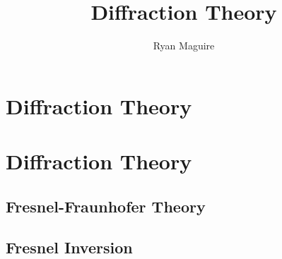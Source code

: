 \documentclass[crop=false,class=book,oneside]{standalone}
\begin{document}
    \ifx\ifplanetdiff\undefined
        \title{Diffraction Theory}
        \author{Ryan Maguire}
        \date{\vspace{-5ex}}
        \maketitle
        \tableofcontents
        \clearpage
        \chapter{Diffraction Theory}
    \else
        \chapter{Diffraction Theory}
    \fi
    \section{Fresnel-Fraunhofer Theory}
    \section{Fresnel Inversion}
\end{document}
